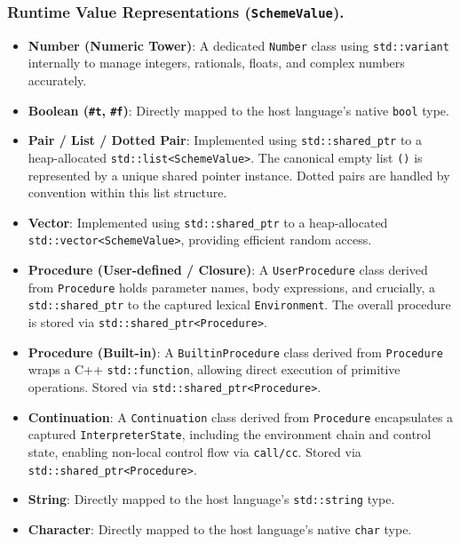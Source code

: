 \documentclass[final]{cmpreport_02}
\begin{document}
\subsubsection*{Runtime Value Representations (\texttt{SchemeValue}).}
\label{tab:runtime-values-appendix}
\begin{itemize}
    \item \textbf{Number (Numeric Tower)}: A dedicated \texttt{Number} class using \texttt{std::variant} internally to manage integers, rationals, floats, and complex numbers accurately.
    \item \textbf{Boolean (\texttt{\#t}, \texttt{\#f})}: Directly mapped to the host language's native \texttt{bool} type.
    \item \textbf{Pair / List / Dotted Pair}: Implemented using \texttt{std::shared\_ptr} to a heap-allocated \texttt{std::list<SchemeValue>}. The canonical empty list \texttt{()} is represented by a unique shared pointer instance. Dotted pairs are handled by convention within this list structure.
    \item \textbf{Vector}: Implemented using \texttt{std::shared\_ptr} to a heap-allocated \newline\texttt{std::vector<SchemeValue>}, providing efficient random access.
    \item \textbf{Procedure (User-defined / Closure)}: A \texttt{UserProcedure} class derived from \texttt{Procedure} holds parameter names, body expressions, and crucially, a \newline\texttt{std::shared\_ptr} to the captured lexical \texttt{Environment}. The overall procedure is stored via \texttt{std::shared\_ptr<Procedure>}.
    \item \textbf{Procedure (Built-in)}: A \texttt{BuiltinProcedure} class derived from \texttt{Procedure} wraps a C++ \texttt{std::function}, allowing direct execution of primitive operations. Stored via \texttt{std::shared\_ptr<Procedure>}.
    \item \textbf{Continuation}: A \texttt{Continuation} class derived from \texttt{Procedure} encapsulates a captured \texttt{InterpreterState}, including the environment chain and control state, enabling non-local control flow via \texttt{call/cc}. Stored via \newline\texttt{std::shared\_ptr<Procedure>}.
    \item \textbf{String}: Directly mapped to the host language's \texttt{std::string} type.
    \item \textbf{Character}: Directly mapped to the host language's native \texttt{char} type.

\end{itemize}
\end{document}
